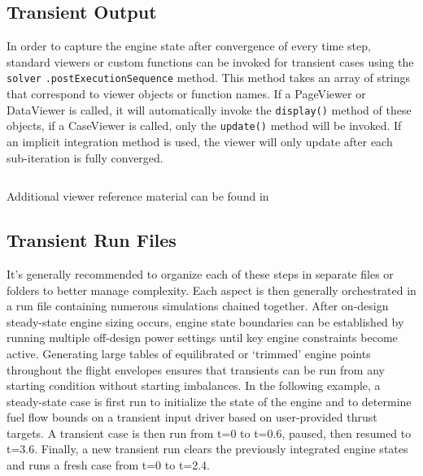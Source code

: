 \documentclass[heading.tex]{subfiles}
\begin{document}
\subsection{Transient Output}

In order to capture the engine state after convergence of every time step, standard viewers or custom functions can be
invoked for transient cases using the \texttt{solver} \texttt{.postExecutionSequence} method. This method takes an array of strings that
correspond to viewer objects or function names. If a PageViewer or DataViewer is called, it will automatically invoke the
\texttt{display()} method of these objects, if a CaseViewer is called, only the \texttt{update()} method will be invoked.
If an implicit integration method is used, the viewer will only update after each sub-iteration is fully converged.

 \begin{adjustwidth}{-1cm}{-1cm}
 \inputminted[]{c++}{code/transient1}
 \end{adjustwidth} 

Additional viewer reference material can be found in \cite[chap.~7.2.2, ~12, ~15.3.1]{NPSS}

\subsection{Transient Run Files}

It's generally recommended to organize each of these steps in separate files
or folders to better manage complexity.
Each aspect is then generally orchestrated in a run file containing numerous simulations chained together. 
After on-design steady-state engine sizing occurs,
engine state boundaries can be established by running multiple
off-design power settings until key engine constraints become active.
Generating large tables of equilibrated or `trimmed' engine points
throughout the flight envelopes ensures that transients can be run from any starting condition without
starting imbalances.
In the following example, a steady-state case is first run to initialize the state of the engine and
to determine fuel flow bounds on a transient input driver based on user-provided thrust targets.
A transient case is then run from t=0 to t=0.6, paused, then resumed to t=3.6.
Finally, a new transient run clears the previously integrated engine states and runs a fresh case from t=0 to t=2.4.

 \begin{adjustwidth}{1cm}{-1cm}
 \inputminted[]{c++}{code/transientRun}
 \end{adjustwidth} 
\end{document}
